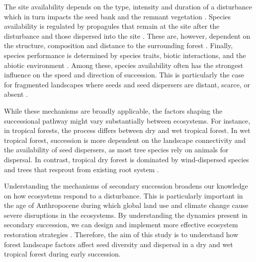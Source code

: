 The site availability depends on the type, intensity and duration of a disturbance which in turn impacts the seed bank and the remnant vegetation \citep{poorterComprehensiveFrameworkVegetation2024}. Species availability is regulated by propagules that remain at the site after the disturbance and those dispersed into the site \citep{gleasonIndividualisticConceptPlant1926, dentUnitingNicheDifferentiation2021}. These are, however, dependent on the structure, composition and distance to the surrounding forest \citep{dentUnitingNicheDifferentiation2021}. Finally, species performance is determined by species traits, biotic interactions, and the abiotic environment \citep{poorterComprehensiveFrameworkVegetation2024}. Among these, species availability often has the strongest influence on the speed and direction of succession. This is particularly the case for fragmented landscapes where seeds and seed dispersers are distant, scarce, or absent \citep{poorterSuccessionalTheories2023, dentUnitingNicheDifferentiation2021}. 

While these mechanisms are broadly applicable, the factors shaping the successional pathway might vary substantially between ecosystems. For instance, in tropical forests, the process differs between dry and wet tropical forest. In wet tropical forest, succession is more dependent on the landscape connectivity and the availability of seed dispersers, as most tree species rely on animals for dispersal. In contrast, tropical dry forest is dominated by wind-dispersed species and trees that resprout from existing root system \citep{hordijkLandUseHistory2024, lohbeckSuccessionalChangesFunctional2013}.




Understanding the mechanisms of secondary succession broadens our knowledge on how ecosystems respond to a disturbance. This is particularly important in the age of Anthropocene during which global land use and climate change cause severe disruptions in the ecosystems. By understanding the dynamics present in secondary succession, we can design and implement more effective ecosystem restoration strategies \citep{poorterSuccessionalTheories2023}. Therefore, the aim of this study is to understand how forest landscape factors affect seed diversity and dispersal in a dry and wet tropical forest during early succession. 

